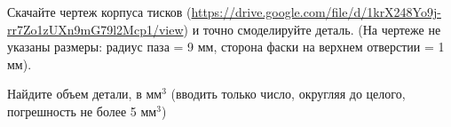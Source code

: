 
Скачайте чертеж корпуса тисков (\url{https://drive.google.com/file/d/1krX248Yo9j-rr7Zo1zUXn9mG79l2Mcp1/view}) и точно смоделируйте деталь.  
(На чертеже не указаны размеры:  радиус паза = 9 мм, 
сторона фаски на верхнем отверстии = 1 мм).


Найдите объем детали, в мм$^3$ (вводить только число, округляя до целого, погрешность не более 5 мм$^3$)